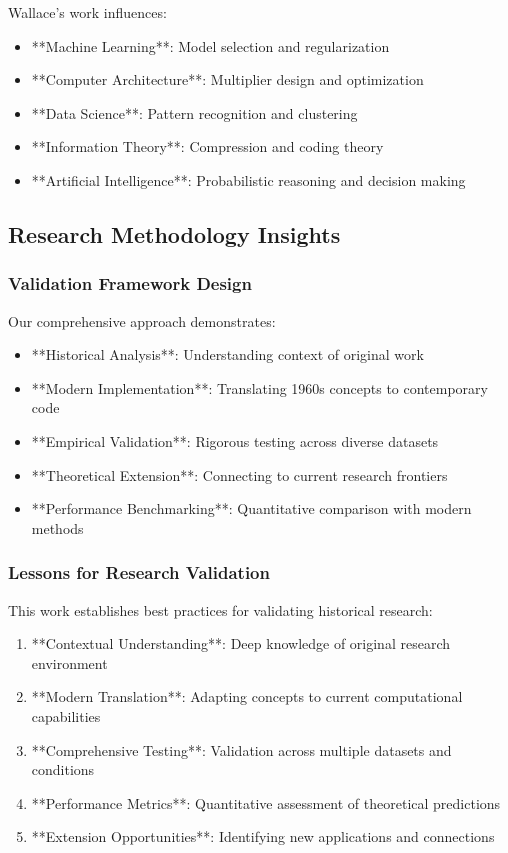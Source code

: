 \documentclass[12pt]{article}
\begin{document}
Wallace's work influences:

\begin{itemize}
    \item **Machine Learning**: Model selection and regularization
    \item **Computer Architecture**: Multiplier design and optimization
    \item **Data Science**: Pattern recognition and clustering
    \item **Information Theory**: Compression and coding theory
    \item **Artificial Intelligence**: Probabilistic reasoning and decision making
\end{itemize}

\subsection{Research Methodology Insights}

\subsubsection{Validation Framework Design}

Our comprehensive approach demonstrates:

\begin{itemize}
    \item **Historical Analysis**: Understanding context of original work
    \item **Modern Implementation**: Translating 1960s concepts to contemporary code
    \item **Empirical Validation**: Rigorous testing across diverse datasets
    \item **Theoretical Extension**: Connecting to current research frontiers
    \item **Performance Benchmarking**: Quantitative comparison with modern methods
\end{itemize}

\subsubsection{Lessons for Research Validation}

This work establishes best practices for validating historical research:

\begin{enumerate}
    \item **Contextual Understanding**: Deep knowledge of original research environment
    \item **Modern Translation**: Adapting concepts to current computational capabilities
    \item **Comprehensive Testing**: Validation across multiple datasets and conditions
    \item **Performance Metrics**: Quantitative assessment of theoretical predictions
    \item **Extension Opportunities**: Identifying new applications and connections
\end{enumerate}
\end{document}
